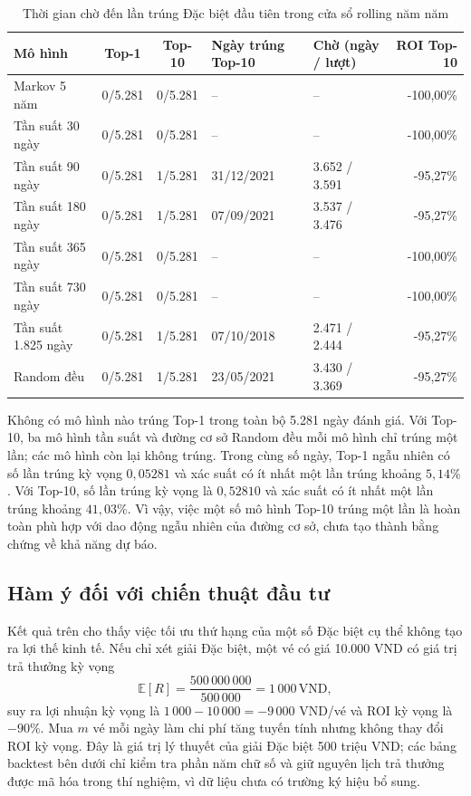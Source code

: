\begin{table}[H]
	\centering
	\small
	\caption{Thời gian chờ đến lần trúng Đặc biệt đầu tiên trong cửa sổ rolling năm năm}
	\label{tab:special-five-year-waiting}
	\begin{tabularx}{\linewidth}{L{3.25cm}ccL{2.65cm}L{2.85cm}r}
		\toprule
		Mô hình & Top-1 & Top-10 & Ngày trúng Top-10 & Chờ (ngày / lượt) & ROI Top-10 \\
		\midrule
		Markov 5 năm & 0/5.281 & 0/5.281 & -- & -- & -100,00\%\\
		Tần suất 30 ngày & 0/5.281 & 0/5.281 & -- & -- & -100,00\%\\
		Tần suất 90 ngày & 0/5.281 & 1/5.281 & 31/12/2021 & 3.652 / 3.591 & -95,27\%\\
		Tần suất 180 ngày & 0/5.281 & 1/5.281 & 07/09/2021 & 3.537 / 3.476 & -95,27\%\\
		Tần suất 365 ngày & 0/5.281 & 0/5.281 & -- & -- & -100,00\%\\
		Tần suất 730 ngày & 0/5.281 & 0/5.281 & -- & -- & -100,00\%\\
		Tần suất 1.825 ngày & 0/5.281 & 1/5.281 & 07/10/2018 & 2.471 / 2.444 & -95,27\%\\
		Random đều & 0/5.281 & 1/5.281 & 23/05/2021 & 3.430 / 3.369 & -95,27\%\\
		\bottomrule
	\end{tabularx}
\end{table}

Không có mô hình nào trúng Top-1 trong toàn bộ 5.281 ngày đánh giá. Với Top-10, ba mô hình tần suất và đường cơ sở Random đều mỗi mô hình chỉ trúng một lần; các mô hình còn lại không trúng. Trong cùng số ngày, Top-1 ngẫu nhiên có số lần trúng kỳ vọng $0,05281$ và xác suất có ít nhất một lần trúng khoảng $5,14\%$. Với Top-10, số lần trúng kỳ vọng là $0,52810$ và xác suất có ít nhất một lần trúng khoảng $41,03\%$. Vì vậy, việc một số mô hình Top-10 trúng một lần là hoàn toàn phù hợp với dao động ngẫu nhiên của đường cơ sở, chưa tạo thành bằng chứng về khả năng dự báo.

\subsection{Hàm ý đối với chiến thuật đầu tư}
Kết quả trên cho thấy việc tối ưu thứ hạng của một số Đặc biệt cụ thể không tạo ra lợi thế kinh tế. Nếu chỉ xét giải Đặc biệt, một vé có giá 10.000 VND có giá trị trả thưởng kỳ vọng
\[
\mathbb{E}[R]=\frac{500\,000\,000}{500\,000}=1\,000\,\text{VND},
\]
suy ra lợi nhuận kỳ vọng là $1\,000-10\,000=-9\,000$ VND/vé và ROI kỳ vọng là $-90\%$. Mua $m$ vé mỗi ngày làm chi phí tăng tuyến tính nhưng không thay đổi ROI kỳ vọng. Đây là giá trị lý thuyết của giải Đặc biệt 500 triệu VND; các bảng backtest bên dưới chỉ kiểm tra phần năm chữ số và giữ nguyên lịch trả thưởng được mã hóa trong thí nghiệm, vì dữ liệu chưa có trường ký hiệu bổ sung.

